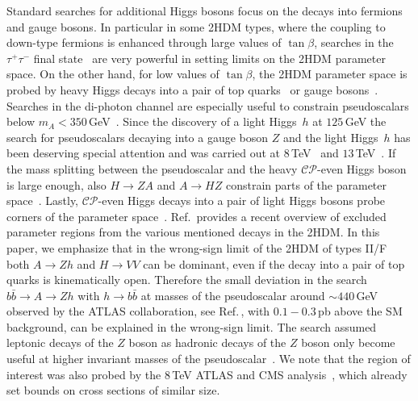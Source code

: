 \documentclass[12pt]{article}
\newcommand{\citere}[1]{Ref.\,\cite{#1}}
\newcommand{\abbrev}{\scalefont{.9}}
\newcommand{\sm}{{\abbrev SM}}
\newcommand{\thdm}{{\abbrev 2HDM}}
\newcommand{\atlas}{{\abbrev ATLAS}}
\newcommand{\cms}{{\abbrev CMS}}
\newcommand{\cp}{{\abbrev $\mathcal{CP}$}}
\begin{document}
Standard searches for additional Higgs bosons focus on the decays into fermions and gauge bosons.
In particular in some \thdm{} types, where the coupling to down-type fermions is enhanced through large
values of $\tan\beta$, searches in the $\tau^+\tau^-$ final state~\cite{Aaboud:2017sjh,CMS-PAS-HIG-16-037}
are very powerful in setting limits on the \thdm{} parameter space.
On the other hand, for low values of $\tan\beta$, the \thdm{} parameter space is probed by heavy Higgs
decays into a pair of top quarks~\cite{Aaboud:2017hnm} or gauge
bosons~\cite{Aaboud:2017fgj,Aaboud:2017itg,Aaboud:2017gsl,ATLAS-CONF-2016-079,ATLAS-CONF-2017-058,
CMS-PAS-HIG-16-001,CMS-PAS-HIG-16-033,CMS-PAS-HIG-16-034}.
Searches in the di-photon channel are especially useful to constrain pseudoscalars below
$m_A<350$\,GeV~\cite{Aaboud:2017yyg, Khachatryan:2016yec}.
Since the discovery of a light Higgs~$h$ at $125$\,GeV  the search for pseudoscalars decaying into a
gauge boson $Z$ and the light Higgs~$h$ has been deserving special attention and was carried out at
$8$\,TeV~\cite{Khachatryan:2015lba,Aad:2015wra} and $13$\,TeV~\cite{ATLAS-CONF-2016-015,ATLAS:2017nxi}.
If the mass splitting between the pseudoscalar and the heavy \cp{}-even Higgs boson is large enough, also
$H\to ZA$ and $A\to HZ$ constrain parts of the parameter space~\cite{Khachatryan:2016are, CMS-PAS-HIG-16-010}.
Lastly, \cp{}-even Higgs decays into a pair of light Higgs bosons probe corners of the parameter
space~\cite{ATLAS-CONF-2016-004,CMS-PAS-HIG-17-008,Aaboud:2016xco,CMS-PAS-B2G-16-026,ATLAS-CONF-2016-049,
ATLAS-CONF-2016-071,Sirunyan:2017guj,Sirunyan:2017djm}.
\citere{Han:2017pfo} provides a recent overview of excluded parameter regions from the various mentioned
decays in the \thdm{}.
In this paper, we emphasize that in the wrong-sign limit of the \thdm{} of types II/F both $A\to Zh$ and
$H\to VV$ can be dominant, even if the decay into a pair of top quarks is kinematically open.
Therefore the small deviation in the search $b\bar b\to A\to Zh$ with $h\to b\bar b$ at masses of the
pseudoscalar around $\sim 440$\,GeV observed by the \atlas{} collaboration, see \citere{ATLAS:2017nxi}, with
$0.1-0.3$\,pb above the \sm{} background, can be explained in the wrong-sign limit.
The search assumed leptonic decays of the $Z$ boson as hadronic decays of the $Z$ boson only become
useful at higher invariant masses of the pseudoscalar~\cite{Aaboud:2017ahz}.
We note that the region of interest was also probed by the $8$\,TeV \atlas{} and \cms{}
analysis~\cite{Khachatryan:2015lba,Aad:2015wra}, which already set bounds on cross sections of similar size.
\end{document}
